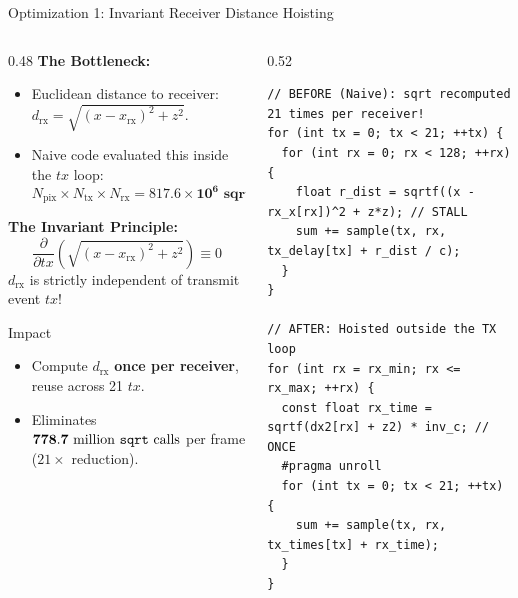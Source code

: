\documentclass[aspectratio=169,10pt]{beamer}
\begin{document}
\begin{frame}[fragile]{Optimization 1: Invariant Receiver Distance Hoisting}
  \begin{columns}[T]
    \begin{column}{0.48\textwidth}
      \textbf{\small The Bottleneck:}
      \scriptsize
      \begin{itemize}
        \item Euclidean distance to receiver: $d_{\text{rx}} = \sqrt{(x - x_{\text{rx}})^2 + z^2}$.
        \item Naive code evaluated this inside the $tx$ loop:
        $$N_{\text{pix}} \times N_{\text{tx}} \times N_{\text{rx}} = \mathbf{817.6\times 10^6\text{ sqrt calls/frame}}$$
      \end{itemize}
      \textbf{\small The Invariant Principle:}
      \scriptsize
      $$\frac{\partial}{\partial tx} \left( \sqrt{(x - x_{\text{rx}})^2 + z^2} \right) \equiv 0$$
      $d_{\text{rx}}$ is strictly independent of transmit event $tx$!
      \begin{block}{Impact}
        \scriptsize
        \begin{itemize}
          \item Compute $d_{\text{rx}}$ \textbf{once per receiver}, reuse across 21 $tx$.
          \item Eliminates $\mathbf{778.7\text{ million \texttt{sqrt} calls}}$ per frame ($21\times$ reduction).
        \end{itemize}
      \end{block}
    \end{column}
    \begin{column}{0.52\textwidth}
\begin{lstlisting}[caption={Receiver Distance Hoisting}]
// BEFORE (Naive): sqrt recomputed 21 times per receiver!
for (int tx = 0; tx < 21; ++tx) {
  for (int rx = 0; rx < 128; ++rx) {
    float r_dist = sqrtf((x - rx_x[rx])^2 + z*z); // STALL
    sum += sample(tx, rx, tx_delay[tx] + r_dist / c);
  }
}

// AFTER: Hoisted outside the TX loop
for (int rx = rx_min; rx <= rx_max; ++rx) {
  const float rx_time = sqrtf(dx2[rx] + z2) * inv_c; // ONCE
  #pragma unroll
  for (int tx = 0; tx < 21; ++tx) {
    sum += sample(tx, rx, tx_times[tx] + rx_time);
  }
}
\end{lstlisting}
    \end{column}
  \end{columns}
\end{frame}
\end{document}
